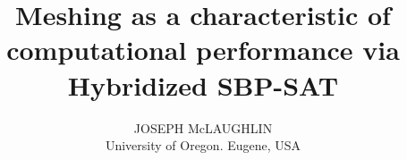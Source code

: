 \title{Meshing as a characteristic of computational performance via Hybridized SBP-SAT}
\author{\small{JOSEPH McLAUGHLIN}\\ University of Oregon. Eugene, USA}